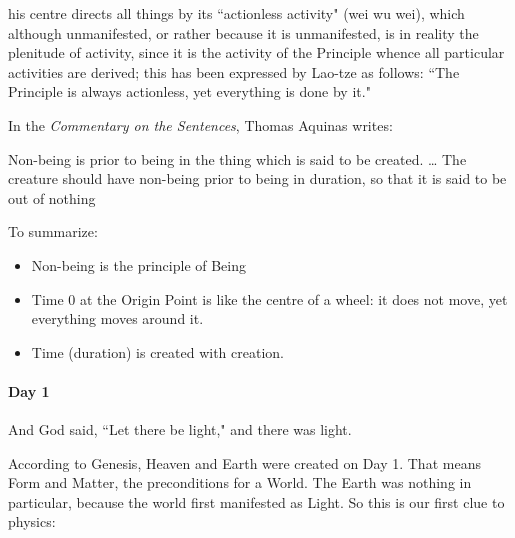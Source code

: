\begin{quotex}
his centre directs all things by its ``actionless activity" (wei wu wei), which although unmanifested, or rather because it is unmanifested, is in reality the plenitude of activity, since it is the activity of the Principle whence all particular activities are derived; this has been expressed by Lao-tze as follows: ``The Principle is always actionless, yet everything is done by it." 

\end{quotex}
In the \textit{Commentary on the Sentences}, Thomas Aquinas writes:

\begin{quotex}
Non-being is prior to being in the thing which is said to be created. … The creature should have non-being prior to being in duration, so that it is said to be out of nothing 

\end{quotex}
To summarize:

\begin{itemize}
\item Non-being is the principle of Being 
\item Time 0 at the Origin Point is like the centre of a wheel: it does not move, yet everything moves around it. 
\item Time (duration) is created with creation. 
\end{itemize}

\paragraph{Day 1}
\begin{quotex}
And God said, ``Let there be light," and there was light. 

\end{quotex}
According to Genesis, Heaven and Earth were created on Day 1. That means Form and Matter, the preconditions for a World. The Earth was nothing in particular, because the world first manifested as Light. So this is our first clue to physics:

